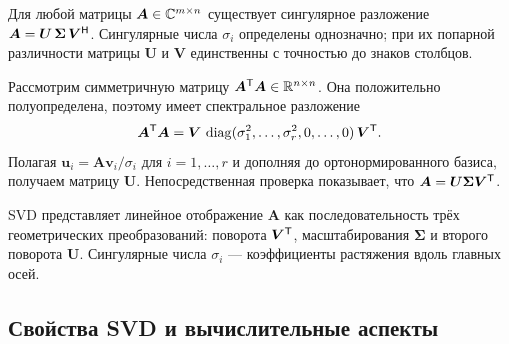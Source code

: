 \begin{tcbtheorem}
\label{thm:svd-exist}
    Для любой матрицы $\bm{A} \in \mathbb{C}^{m \times n}$ существует сингулярное
    разложение $\bm{A} = \bm{U}\,\bm{\Sigma}\,\bm{V}^{\mathsf{H}}$.
    Сингулярные числа $\sigma_i$ определены однозначно;
    при их попарной различности матрицы $\bm{U}$ и $\bm{V}$ единственны
    с точностью до знаков столбцов.
\end{tcbtheorem}

\begin{tcbproof}
    Рассмотрим симметричную матрицу $\bm{A}^{\mathsf{T}}\bm{A} \in \mathbb{R}^{n \times n}$.
    Она положительно полуопределена, поэтому имеет спектральное разложение
    \begin{equation}
        \bm{A}^{\mathsf{T}}\bm{A}
        = \bm{V}\,\operatorname{diag}(\sigma_1^2, \ldots, \sigma_r^2, 0, \ldots, 0)\,\bm{V}^{\mathsf{T}}.
        \label{eq:ata}
    \end{equation}
    Полагая $\bm{u}_i = \bm{A}\bm{v}_i / \sigma_i$ для $i = 1, \ldots, r$
    и дополняя до ортонормированного базиса, получаем матрицу $\bm{U}$.
    Непосредственная проверка показывает, что $\bm{A} = \bm{U}\bm{\Sigma}\bm{V}^{\mathsf{T}}$.
\end{tcbproof}

\begin{tcbinsight}
    SVD представляет линейное отображение $\bm{A}$ как последовательность
    трёх геометрических преобразований: поворота $\bm{V}^{\mathsf{T}}$, масштабирования
    $\bm{\Sigma}$ и второго поворота $\bm{U}$.
    Сингулярные числа $\sigma_i$ — коэффициенты растяжения вдоль главных осей.
\end{tcbinsight}

\subsection{Свойства SVD и вычислительные аспекты}
\label{sec:svd-props}

